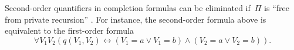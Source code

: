 \documentclass{article}
\def\lrar{\leftrightarrow}
\begin{document}
Second-order quantifiers in completion formulas can be eliminated if~$\Pi$
is ``free from private recursion''
\cite[Section~6.4]{fan20}.  For instance, the second-order formula above
is equivalent to the first-order formula
$$
\forall V_1V_2(q(V_1,V_2) \lrar (V_1=a \lor V_1=b)\land(V_2=a \lor V_2=b)).
$$
\end{document}
